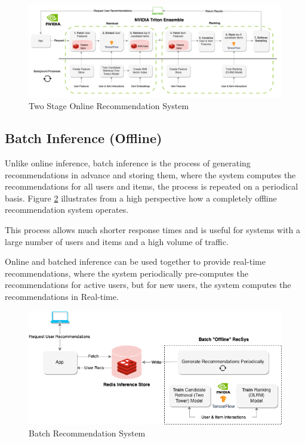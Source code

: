 \begin{figure}[H]
    \centering
    \includegraphics[width=1\textwidth]{assets/online-two-stage-recommender-pipeline.png}
    \caption[Two Stage Online Recommendation System]{Two Stage Online Recommendation System \cite{NvidiaFeatureStores}}
    \label{fig:TwoStageOnline}
\end{figure}



\subsection{Batch Inference (Offline)}
Unlike online inference, batch inference is the process of generating recommendations in advance and storing them, 
where the system computes the recommendations for all users and items, 
the process is repeated on a periodical basis.\cite{NvidiaFeatureStores} 
Figure \ref{fig:BatchRecSys} illustrates from a high perspective how a completely offline recommendation system operates.

This process allows much shorter response times and is useful for systems with a large number of users and items and a high volume of traffic.

Online and batched inference can be used together to provide real-time recommendations, where the system periodically pre-computes the recommendations for active users, but for new users, the system computes the recommendations in Real-time.

\begin{figure}[H]
    \centering
    \includegraphics[width=1\textwidth]{assets/batch-recommendation-system.png}
    \caption[Batch Recommendation System]{Batch Recommendation System \cite{NvidiaFeatureStores}}
    \label{fig:BatchRecSys}
\end{figure}